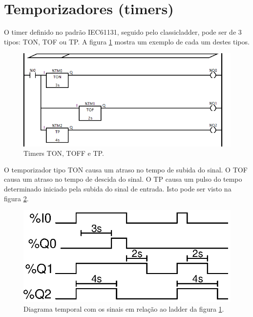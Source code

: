 \section{Temporizadores (timers)}
O timer definido no padrão IEC61131, seguido pelo classicladder, pode ser de 3 tipos: TON, TOF ou TP. A figura \ref{fig:cl_timers} mostra um exemplo de cada um destes tipos.
\begin{figure}[hbt]
	\centering
	\includegraphics[width=\textwidth]{figuras/cl_timers}
	\caption{Timers TON, TOFF e TP.}
	\label{fig:cl_timers}
\end{figure}

O temporizador tipo TON causa um atraso no tempo de subida do sinal. O TOF causa um atraso no tempo de descida do sinal. O TP causa um pulso do tempo determinado iniciado pela subida do sinal de entrada. Isto pode ser visto na figura \ref{fig:tempoTimers}.
\begin{figure}[hbt]
	\centering
	\includegraphics[scale=0.6]{figuras/tempoTimers}
	\caption{Diagrama temporal com os sinais em relação ao ladder da figura \ref{fig:cl_timers}.}
	\label{fig:tempoTimers}
\end{figure}